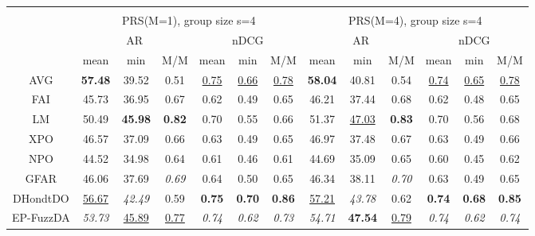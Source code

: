\begin{tabular}{ c | c c c | c c c || c c c | c c c}
\multicolumn{12}{c}{} \\
\multicolumn{1}{c}{} & \multicolumn{6}{c}{PRS(M=1), group size s=4} & \multicolumn{6}{c}{PRS(M=4), group size s=4} \\
\multicolumn{1}{c}{} & \multicolumn{3}{c}{AR} & \multicolumn{3}{c}{nDCG} & \multicolumn{3}{c}{AR} & \multicolumn{3}{c}{nDCG} \\
& mean & min & M/M & mean & min & M/M & mean & min & M/M & mean & min & M/M \\
\hline
AVG & \textbf{57.48} & 39.52 & 0.51 & \underline{0.75} & \underline{0.66} & \underline{0.78} & \textbf{58.04} & 40.81 & 0.54 & \underline{0.74} & \underline{0.65} & \underline{0.78} \\
FAI & 45.73 & 36.95 & 0.67 & 0.62 & 0.49 & 0.65 & 46.21 & 37.44 & 0.68 & 0.62 & 0.48 & 0.65 \\
LM & 50.49 & \textbf{45.98} & \textbf{0.82} & 0.70 & 0.55 & 0.66 & 51.37 & \underline{47.03} & \textbf{0.83} & 0.70 & 0.56 & 0.68 \\
XPO & 46.57 & 37.09 & 0.66 & 0.63 & 0.49 & 0.65 & 46.97 & 37.48 & 0.67 & 0.63 & 0.49 & 0.66 \\
NPO & 44.52 & 34.98 & 0.64 & 0.61 & 0.46 & 0.61 & 44.69 & 35.09 & 0.65 & 0.60 & 0.45 & 0.62 \\
GFAR & 46.06 & 37.69 & \textit{0.69} & 0.64 & 0.50 & 0.65 & 46.34 & 38.11 & \textit{0.70} & 0.63 & 0.49 & 0.65 \\
DHondtDO & \underline{56.67} & \textit{42.49} & 0.59 & \textbf{0.75} & \textbf{0.70} & \textbf{0.86} & \underline{57.21} & \textit{43.78} & 0.62 & \textbf{0.74} & \textbf{0.68} & \textbf{0.85} \\
EP-FuzzDA & \textit{53.73} & \underline{45.89} & \underline{0.77} & \textit{0.74} & \textit{0.62} & \textit{0.73} & \textit{54.71} & \textbf{47.54} & \underline{0.79} & \textit{0.74} & \textit{0.62} & \textit{0.74} \\


\end{tabular}
